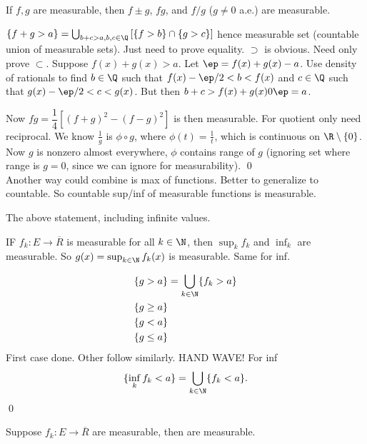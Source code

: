 \begin{thm}
If $f,g$ are measurable, then $f \pm g$, $fg$, and $f/g$ ($g \neq 0$ a.e.) are measurable.
\end{thm}

\pf $\{f+g>a\}= \bigcup_{b+c>a, b,c \in \Q} \left[ \{f>b\} \cap \{g>c\} \right]$ hence measurable set (countable union of measurable sets). Just need to prove equality. $\supset$ is obvious. Need only prove $\subset$. Suppose $f(x)+g(x)>a$. Let $\ep= f(x)+g(x)-a$. Use density of rationals to find $b \in \Q$ such that $f(x)- \ep/2<b<f(x)$ and $c \in \Q$ such that $g(x) - \ep/2<c<g(x)$. But then $b+c>f(x)+g(x)0\ep=a$. 

Now $fg= \dfrac{1}{4} \left[ (f+g)^2 - (f-g)^2 \right]$ is then measurable. For quotient only need reciprocal. We know $\frac{1}{g}$ is $\phi \circ g$, where $\phi(t)=\frac{1}{t}$, which is continuous on $\R \setminus \{0\}$. Now $g$ is nonzero almost everywhere, $\phi$ contains range of $g$ (ignoring set where range is $g=0$, since we can ignore for measurability). \qed \\



Another way could combine is max of functions. Better to generalize to countable. So countable sup/inf of measurable functions is measurable.

\begin{thm}
The above statement, including infinite values. 
\end{thm}

\pf IF $f_k: E \to \overline{R}$ is measurable for all $k \in \N$, then $\sup_k f_k$ and $\inf_k$ are measurable. So $g(x)= \sup_{k \in \N} f_k(x)$ is measurable. Same for inf. 


	\[
	\begin{split}
	\{g>a\}&= \bigcup_{k \in \N} \{f_k>a\} \\
	\{g \geq a\}& \\
	\{g<a\}& \\
	\{g \leq a\}& \\
	\end{split}
	\]
First case done. Other follow similarly. HAND WAVE! For inf
	\[
	\{ \inf_k f_k<a\}= \bigcup_{k \in \N} \{f_k<a\}.
	\]
\qed \\





\begin{thm}
Suppose $f_k: E \to \overline{R}$ are measurable, then
are measurable. 
\end{thm}

